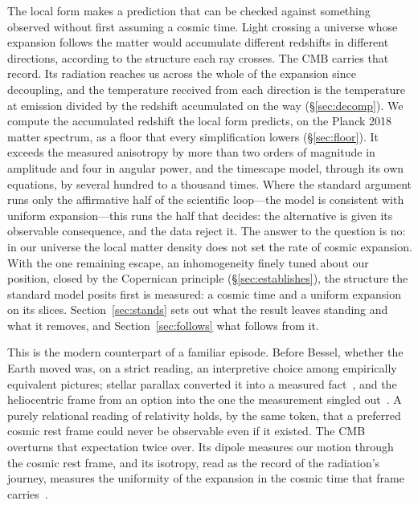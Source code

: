\documentclass[11pt,a4paper]{article}
\begin{document}
The local form makes a prediction that can be checked against something observed without first assuming a cosmic time. Light crossing a universe whose expansion follows the matter would accumulate different redshifts in different directions, according to the structure each ray crosses. The CMB carries that record. Its radiation reaches us across the whole of the expansion since decoupling, and the temperature received from each direction is the temperature at emission divided by the redshift accumulated on the way (\S\ref{sec:decomp}). We compute the accumulated redshift the local form predicts, on the Planck 2018 matter spectrum, as a floor that every simplification lowers (\S\ref{sec:floor}). It exceeds the measured anisotropy by more than two orders of magnitude in amplitude and four in angular power, and the timescape model, through its own equations, by several hundred to a thousand times. Where the standard argument runs only the affirmative half of the scientific loop---the model is consistent with uniform expansion---this runs the half that decides: the alternative is given its observable consequence, and the data reject it. The answer to the question is no: in our universe the local matter density does not set the rate of cosmic expansion. With the one remaining escape, an inhomogeneity finely tuned about our position, closed by the Copernican principle (\S\ref{sec:establishes}), the structure the standard model posits first is measured: a cosmic time and a uniform expansion on its slices. Section~\ref{sec:stands} sets out what the result leaves standing and what it removes, and Section~\ref{sec:follows} what follows from it.

This is the modern counterpart of a familiar episode. Before Bessel, whether the Earth moved was, on a strict reading, an interpretive choice among empirically equivalent pictures; stellar parallax converted it into a measured fact~\cite{Bessel1838}, and the heliocentric frame from an option into the one the measurement singled out~\cite{JanzenFortress}. A purely relational reading of relativity holds, by the same token, that a preferred cosmic rest frame could never be observable even if it existed. The CMB overturns that expectation twice over. Its dipole measures our motion through the cosmic rest frame, and its isotropy, read as the record of the radiation's journey, measures the uniformity of the expansion in the cosmic time that frame carries~\cite{Janzen2025, JanzenWildGoose}.
\end{document}
